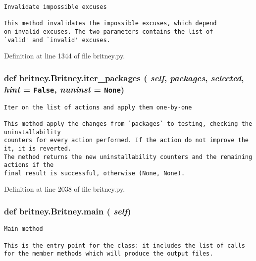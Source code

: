 \footnotesize\begin{verbatim}Invalidate impossible excuses

This method invalidates the impossible excuses, which depend
on invalid excuses. The two parameters contains the list of
`valid' and `invalid' excuses.
\end{verbatim}
\normalsize
 

Definition at line 1344 of file britney.py.
\subsubsection{\setlength{\rightskip}{0pt plus 5cm}def britney.Britney.iter\_\-packages ( {\em self},  {\em packages},  {\em selected},  {\em hint} = {\tt False},  {\em nuninst} = {\tt None})}\label{classbritney_1_1Britney_d453398832baaa7f477f720cfb643029}




\footnotesize\begin{verbatim}Iter on the list of actions and apply them one-by-one

This method apply the changes from `packages` to testing, checking the uninstallability
counters for every action performed. If the action do not improve the it, it is reverted.
The method returns the new uninstallability counters and the remaining actions if the
final result is successful, otherwise (None, None).
\end{verbatim}
\normalsize
 

Definition at line 2038 of file britney.py.
\subsubsection{\setlength{\rightskip}{0pt plus 5cm}def britney.Britney.main ( {\em self})}\label{classbritney_1_1Britney_0e9551bdf927388f55be5ce15a48c94f}




\footnotesize\begin{verbatim}Main method

This is the entry point for the class: it includes the list of calls
for the member methods which will produce the output files.
\end{verbatim}
\normalsize
 


